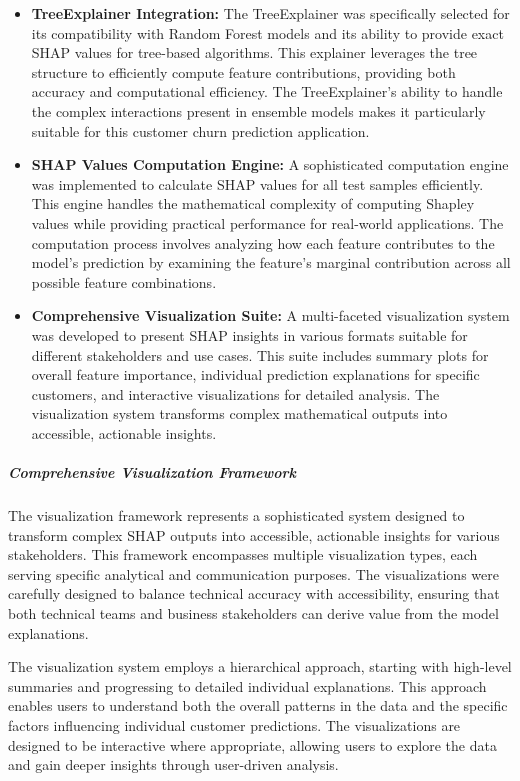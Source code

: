 \documentclass{article}
\begin{document}
\begin{itemize}
    \item \textbf{TreeExplainer Integration:} The TreeExplainer was specifically selected for its compatibility with Random Forest models and its ability to provide exact SHAP values for tree-based algorithms. This explainer leverages the tree structure to efficiently compute feature contributions, providing both accuracy and computational efficiency. The TreeExplainer's ability to handle the complex interactions present in ensemble models makes it particularly suitable for this customer churn prediction application.
    
    \item \textbf{SHAP Values Computation Engine:} A sophisticated computation engine was implemented to calculate SHAP values for all test samples efficiently. This engine handles the mathematical complexity of computing Shapley values while providing practical performance for real-world applications. The computation process involves analyzing how each feature contributes to the model's prediction by examining the feature's marginal contribution across all possible feature combinations.
    
    \item \textbf{Comprehensive Visualization Suite:} A multi-faceted visualization system was developed to present SHAP insights in various formats suitable for different stakeholders and use cases. This suite includes summary plots for overall feature importance, individual prediction explanations for specific customers, and interactive visualizations for detailed analysis. The visualization system transforms complex mathematical outputs into accessible, actionable insights.
\end{itemize}

\subparagraph{Comprehensive Visualization Framework}

The visualization framework represents a sophisticated system designed to transform complex SHAP outputs into accessible, actionable insights for various stakeholders. This framework encompasses multiple visualization types, each serving specific analytical and communication purposes. The visualizations were carefully designed to balance technical accuracy with accessibility, ensuring that both technical teams and business stakeholders can derive value from the model explanations.

The visualization system employs a hierarchical approach, starting with high-level summaries and progressing to detailed individual explanations. This approach enables users to understand both the overall patterns in the data and the specific factors influencing individual customer predictions. The visualizations are designed to be interactive where appropriate, allowing users to explore the data and gain deeper insights through user-driven analysis.
\end{document}
